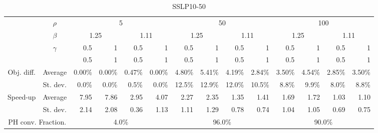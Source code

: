 \documentclass[preprint, 1p, review]{elsarticle}
\begin{document}
 \begin{table}[htbp]
   \centering
   \tiny
     \begin{tabular}{ccrrrrrrrrrrrr}
     \toprule
\multirow{3}[6]{*}{} & $\rho$ & \multicolumn{4}{c}{5} & \multicolumn{4}{c}{50} & \multicolumn{4}{c}{100} \\
     
        & $\beta$ & \multicolumn{2}{c}{1.25} & \multicolumn{2}{c}{1.11} & \multicolumn{2}{c}{1.25} & \multicolumn{2}{c}{1.11} & \multicolumn{2}{c}{1.25} & \multicolumn{2}{c}{1.11} \\
        & $\gamma$ & 0.5 & 1  & 0.5 & 1  & 0.5 & 1  & 0.5 & 1  & 0.5 & 1  & 0.5 & 1 \\    \midrule
     \multicolumn{2}{c}{} & 0.5 & 1  & 0.5 & 1  & 0.5 & 1  & 0.5 & 1  & 0.5 & 1  & 0.5 & 1 \\
     \multirow{2}[4]{*}{Obj. diff.} & Average & 0.00\% & 0.00\% & 0.47\% & 0.00\% & 4.80\% & 5.41\% & 4.19\% & 2.84\% & 3.50\% & 4.54\% & 2.85\% & 3.50\% \\
        & St. dev. & 0.0\% & 0.0\% & 0.5\% & 0.0\% & 12.5\% & 12.9\% & 12.0\% & 10.5\% & 8.8\% & 9.9\% & 8.0\% & 8.8\% \\
     \multirow{2}[4]{*}{Speed-up} & Average & 7.95 & 7.86 & 2.95 & 4.07 & 2.27 & 2.35 & 1.35 & 1.41 & 1.69 & 1.72 & 1.03 & 1.10 \\
        & St. dev. & 2.14 & 2.08 & 0.36 & 1.13 & 1.11 & 1.29 & 0.78 & 0.74 & 1.04 & 1.05 & 0.69 & 0.75 \\
     \multicolumn{2}{c}{PH conv. Fraction.} & \multicolumn{4}{c}{4.0\%} & \multicolumn{4}{c}{96.0\%} & \multicolumn{4}{c}{90.0\%} \\
     \bottomrule
     \end{tabular}%
   \caption{SSLP10-50}          
   \label{tab:App6}%
\end{table}%

  
  
\end{document}
